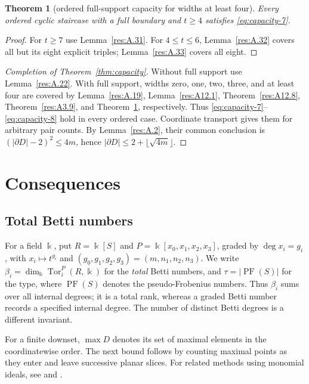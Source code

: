 \documentclass[11pt]{article}
\newtheorem{theorem}{Theorem}[section]
\theoremstyle{definition}
\theoremstyle{remark}
\theoremstyle{plain}
\begin{document}
\begin{theorem}[ordered full-support capacity for widths at least four]\label{res:A.35} Every ordered cyclic staircase with a full boundary and \(t\ge4\) satisfies \eqref{eq:capacity-7}.
\end{theorem}
\begin{proof} For \(t\ge7\) use Lemma~\ref{res:A.31}. For \(4\le t\le6\), Lemma~\ref{res:A.32} covers all but its eight explicit triples; Lemma~\ref{res:A.33} covers all eight. \end{proof}


\begin{proof}[Completion of Theorem~\ref{thm:capacity}]
Without full support use Lemma~\ref{res:A.22}. With full support,
widths zero, one, two, three, and at least four are covered by
Lemma~\ref{res:A.19}, Lemma~\ref{res:A12.1},
Theorem~\ref{res:A12.8}, Theorem~\ref{res:A3.9}, and
Theorem~\ref{res:A.35}, respectively.
Thus \eqref{eq:capacity-7}--\eqref{eq:capacity-8} hold in every ordered case. Coordinate transport
gives them for arbitrary pair counts. By Lemma~\ref{res:A.2}, their
common conclusion is $(|\partial D|-2)^2\le4m$, hence
$|\partial D|\le2+\lfloor\sqrt{4m}\rfloor$.
\end{proof}
\section{Consequences}\label{sec:betti}
\subsection{Total Betti numbers}

For a field $\Bbbk$, put $R=\Bbbk[S]$ and
$P=\Bbbk[x_0,x_1,x_2,x_3]$, graded by $\deg x_i=g_i$, with $x_i\mapsto t^{g_i}$ and
$(g_0,g_1,g_2,g_3)=(m,n_1,n_2,n_3)$.  We write
$\beta_i=\dim_{\Bbbk}\operatorname{Tor}_i^P(R,\Bbbk)$ for the
\emph{total} Betti numbers, and $\tau=|\operatorname{PF}(S)|$ for the type, where $\operatorname{PF}(S)$ denotes the pseudo-Frobenius numbers.
Thus $\beta_i$ sums over all internal degrees; it is a total rank,
whereas a graded Betti number records a specified internal degree.
The number of distinct Betti degrees is a different invariant.

For a finite downset, $\max D$ denotes its set of maximal elements
in the coordinatewise order. The next bound follows by counting
maximal points as they enter and leave successive planar slices.
For related methods using monomial ideals, see
\cite[Corollaries~4.4 and~5.5]{BPS98} and
\cite[Chapters~3 and~6]{MillerSturmfels05}.
\end{document}
